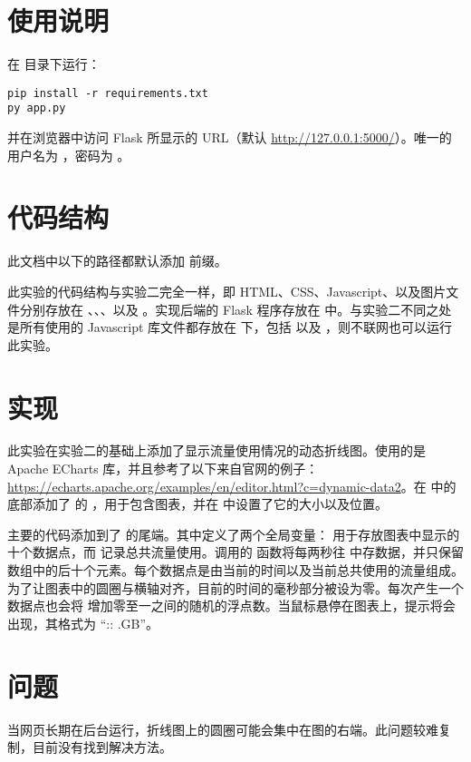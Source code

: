 \section{使用说明}

在  目录下运行：
\begin{lstlisting}
pip install -r requirements.txt
py app.py
\end{lstlisting}

并在浏览器中访问 Flask 所显示的 URL（默认 \url{http://127.0.0.1:5000/}）。唯一的用户名为 ，密码为 。

\section{代码结构}

此文档中以下的路径都默认添加  前缀。

此实验的代码结构与实验二完全一样，即 HTML、CSS、Javascript、以及图片文件分别存放在 、、、以及 。实现后端的 Flask 程序存放在  中。与实验二不同之处是所有使用的 Javascript 库文件都存放在  下，包括  以及 ，则不联网也可以运行此实验。

\section{实现}

此实验在实验二的基础上添加了显示流量使用情况的动态折线图。使用的是 Apache ECharts 库，并且参考了以下来自官网的例子：\url{https://echarts.apache.org/examples/en/editor.html?c=dynamic-data2}。在  中的底部添加了  的 ，用于包含图表，并在  中设置了它的大小以及位置。

主要的代码添加到了  的尾端。其中定义了两个全局变量：  用于存放图表中显示的十个数据点，而  记录总共流量使用。调用的  函数将每两秒往  中存数据，并只保留数组中的后十个元素。每个数据点是由当前的时间以及当前总共使用的流量组成。为了让图表中的圆圈与横轴对齐，目前的时间的毫秒部分被设为零。每次产生一个数据点也会将  增加零至一之间的随机的浮点数。当鼠标悬停在图表上，提示将会出现，其格式为 “:: .GB”。

\section{问题}

当网页长期在后台运行，折线图上的圆圈可能会集中在图的右端。此问题较难复制，目前没有找到解决方法。